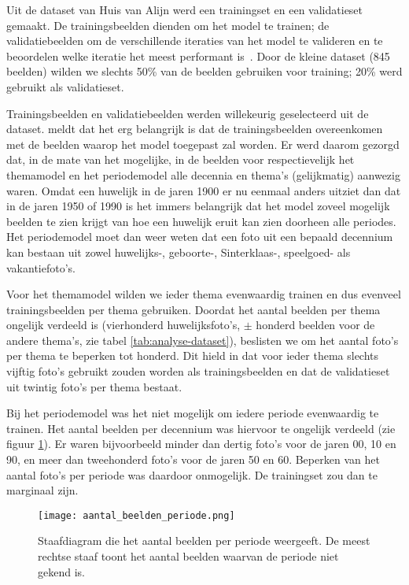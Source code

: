 Uit de dataset van Huis van Alijn werd een trainingset en een validatieset gemaakt. De trainingsbeelden dienden om het model te trainen; de validatiebeelden om de verschillende iteraties van het model te valideren en te beoordelen welke iteratie het meest performant is~\autocites{Lievens2017}{Brownlee2017}. Door de kleine dataset (845 beelden) wilden we slechts 50\% van de beelden gebruiken voor training; 20\% werd gebruikt als validatieset.


Trainingsbeelden en validatiebeelden werden willekeurig geselecteerd uit de dataset. \textcite{Gong2017} meldt dat het erg belangrijk is dat de trainingsbeelden overeenkomen met de beelden waarop het model toegepast zal worden. Er werd daarom gezorgd dat, in de mate van het mogelijke, in de beelden voor respectievelijk het themamodel en het periodemodel alle decennia en thema’s (gelijkmatig) aanwezig waren. Omdat een huwelijk in de jaren 1900 er nu eenmaal anders uitziet dan dat in de jaren 1950 of 1990 is het immers belangrijk dat het model zoveel mogelijk beelden te zien krijgt van hoe een huwelijk eruit kan zien doorheen alle periodes. Het periodemodel moet dan weer weten dat een foto uit een bepaald decennium kan bestaan uit zowel huwelijks-, geboorte-, Sinterklaas-, speelgoed- als vakantiefoto’s.

Voor het themamodel wilden we ieder thema evenwaardig trainen en dus evenveel trainingsbeelden per thema gebruiken. Doordat het aantal beelden per thema ongelijk verdeeld is (vierhonderd huwelijksfoto’s, $\pm$ honderd beelden voor de andere thema’s, zie tabel \ref{tab:analyse-dataset}), beslisten we om het aantal foto’s per thema te beperken tot honderd. Dit hield in dat voor ieder thema slechts vijftig foto’s gebruikt zouden worden als trainingsbeelden en dat de validatieset uit twintig foto’s per thema bestaat. 

Bij het periodemodel was het niet mogelijk om iedere periode evenwaardig te trainen. Het aantal beelden per decennium was hiervoor te ongelijk verdeeld (zie figuur \ref{fig:aantal-beelden-periode}). Er waren bijvoorbeeld minder dan dertig foto’s voor de jaren 00, 10 en 90, en meer dan tweehonderd foto’s voor de jaren 50 en 60. Beperken van het aantal foto’s per periode was daardoor onmogelijk. De trainingset zou dan  te marginaal zijn.

\begin{figure}
	\centering
	\texttt{[image: aantal\_beelden\_periode.png]}\hfill
	\caption[Staafdiagram met het aantal beelden per periode]{Staafdiagram die het aantal beelden per periode weergeeft. De meest rechtse staaf toont het aantal beelden waarvan de periode niet gekend is.}
	\label{fig:aantal-beelden-periode}
\end{figure}


